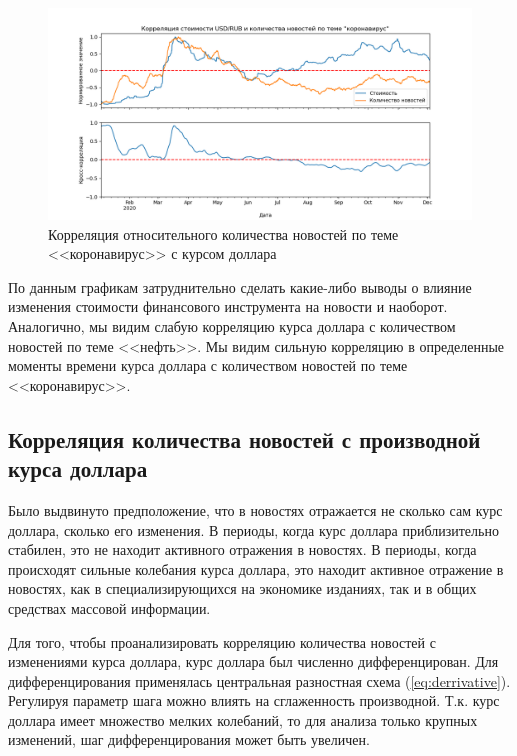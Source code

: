 \begin{figure}[h]
    \centering
    \includegraphics[width=\linewidth]{images/correlations/relative/коронавирус.png}
    \caption{Корреляция относительного количества новостей по теме <<коронавирус>> с курсом доллара}
    \label{img:correlation-relative-covid}
\end{figure}

По данным графикам затруднительно сделать какие-либо выводы о влияние изменения стоимости финансового инструмента на новости и наоборот.  Аналогично, мы видим слабую корреляцию курса доллара с количеством новостей по теме <<нефть>>. Мы видим сильную корреляцию в определенные моменты времени курса доллара с количеством новостей по теме <<коронавирус>>.

\subsection{Корреляция количества новостей с производной курса доллара}

Было выдвинуто предположение, что в новостях отражается не сколько сам курс доллара, сколько его изменения. В периоды, когда курс доллара приблизительно стабилен, это не находит активного отражения в новостях. В периоды, когда происходят сильные колебания курса доллара, это находит активное отражение в новостях, как в специализирующихся на экономике изданиях, так и в общих средствах массовой информации.

Для того, чтобы проанализировать корреляцию количества новостей с изменениями курса доллара, курс доллара был численно дифференцирован. Для дифференцирования применялась центральная разностная схема (\ref{eq:derrivative}). Регулируя параметр шага можно влиять на сглаженность производной. Т.к. курс доллара имеет множество мелких колебаний, то для анализа только крупных изменений, шаг дифференцирования может быть увеличен.

